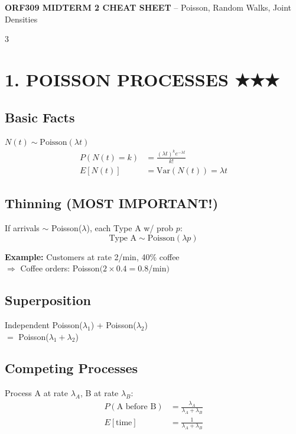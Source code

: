 \documentclass[7pt,landscape]{extarticle}
\begin{document}
\noindent\textbf{ORF309 MIDTERM 2 CHEAT SHEET} -- Poisson, Random Walks, Joint Densities

\vspace{1pt}

\begin{multicols}{3}
\raggedcolumns

\section*{1. POISSON PROCESSES ★★★}

\subsection*{Basic Facts}
$N(t) \sim \text{Poisson}(\lambda t)$
\begin{align*}
P(N(t) = k) &= \frac{(\lambda t)^k e^{-\lambda t}}{k!} \\
E[N(t)] &= \text{Var}(N(t)) = \lambda t
\end{align*}

\subsection*{Thinning (MOST IMPORTANT!)}
\begin{compactbox}
If arrivals $\sim$ Poisson($\lambda$), each Type A w/ prob $p$:
$$\boxed{\text{Type A} \sim \text{Poisson}(\lambda p)}$$
\end{compactbox}

\textbf{Example:} Customers at rate 2/min, 40\% coffee \\
$\Rightarrow$ Coffee orders: Poisson$(2 \times 0.4 = 0.8$/min$)$

\subsection*{Superposition}
Independent Poisson($\lambda_1$) + Poisson($\lambda_2$) \\
$= $ Poisson($\lambda_1 + \lambda_2$)

\subsection*{Competing Processes}
Process A at rate $\lambda_A$, B at rate $\lambda_B$:
\begin{align*}
P(\text{A before B}) &= \frac{\lambda_A}{\lambda_A + \lambda_B} \\
E[\text{time}] &= \frac{1}{\lambda_A + \lambda_B}
\end{align*}


\end{multicols}
\end{document}
